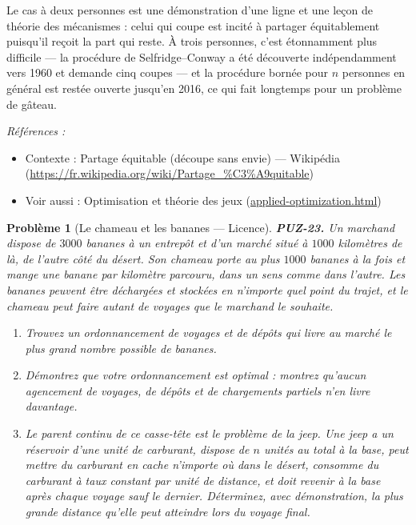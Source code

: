 \documentclass[11pt]{article}
\newtheorem{problem}{Problème}
\newenvironment{refs}{\par\small\noindent\emph{Références :}\begin{itemize}\setlength\itemsep{0pt}}{\end{itemize}\normalsize}
\begin{document}
\noindent Le cas à deux personnes est une démonstration d'une ligne et une leçon de
théorie des mécanismes : celui qui coupe est incité à partager équitablement puisqu'il
reçoit la part qui reste. À trois personnes, c'est étonnamment plus difficile --- la procédure
de Selfridge--Conway a été découverte indépendamment vers 1960 et demande cinq coupes --- et la
procédure bornée pour $ n $ personnes en général est restée ouverte jusqu'en 2016, ce qui
fait longtemps pour un problème de gâteau.

\begin{refs}
\item Contexte : Partage équitable (découpe sans envie) --- Wikipédia (\url{https://fr.wikipedia.org/wiki/Partage_%C3%A9quitable})
\item Voir aussi : Optimisation et théorie des jeux (\url{applied-optimization.html})
\end{refs}

\bigskip

\begin{problem}[{Le chameau et les bananes --- Licence}]
\textbf{PUZ-23.} Un marchand dispose de $ 3000 $ bananes à un entrepôt et d'un marché situé à $ 1000 $ kilomètres de là, de l'autre côté du désert. Son chameau porte au plus $ 1000 $ bananes à la fois et mange une banane par kilomètre parcouru, dans un sens comme dans l'autre. Les bananes peuvent être déchargées et stockées en n'importe quel point du trajet, et le chameau peut faire autant de voyages que le marchand le souhaite.
\begin{enumerate}
\item[(a)] Trouvez un ordonnancement de voyages et de dépôts qui livre au marché le plus grand nombre possible de bananes.
\item[(b)] Démontrez que votre ordonnancement est optimal : montrez qu'aucun agencement de voyages, de dépôts et de chargements partiels n'en livre davantage.
\item[(c)] Le parent continu de ce casse-tête est le problème de la jeep. Une jeep a un réservoir d'une unité de carburant, dispose de $ n $ unités au total à la base, peut mettre du carburant en cache n'importe où dans le désert, consomme du carburant à taux constant par unité de distance, et doit revenir à la base après chaque voyage sauf le dernier. Déterminez, avec démonstration, la plus grande distance qu'elle peut atteindre lors du voyage final.
\end{enumerate}

\end{problem}
\end{document}
